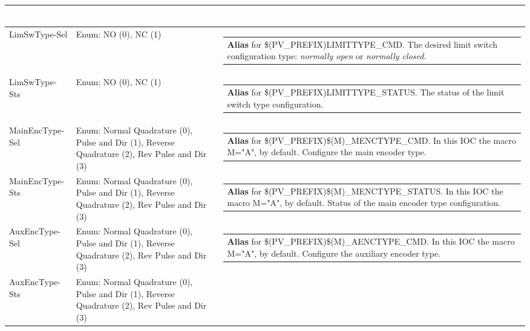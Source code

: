 \documentclass[openany]{article}
\begin{document}
\begin{longtable}{| m{4.5cm} m{2.5cm}  m{8.5cm} |}
\begin{tabular}{@{}m{6cm}@{}}
            \end{tabular} \hypertarget{pv:lim-sw-type}{}\\ \hline
        LimSwType-Sel & Enum: NO (0), NC (1) & \begin{tabular}{@{}m{6cm}@{}}
                \textbf{\color{blue} Alias} for \$(PV\_PREFIX)LIMITTYPE\_CMD. The desired limit switch configuration type: \emph{normally open} or \emph{normally closed}.
            \end{tabular} \hypertarget{}{}\\ \hline
        LimSwType-Sts & Enum: NO (0), NC (1) & \begin{tabular}{@{}m{6cm}@{}}
                \textbf{\color{blue} Alias} for \$(PV\_PREFIX)LIMITTYPE\_STATUS. The status of the limit switch type configuration.
            \end{tabular} \hypertarget{pv:main-enc-type}{}\\ \hline
        MainEncType-Sel & Enum: Normal Quadrature (0), Pulse and Dir (1), Reverse Quadrature (2), Rev Pulse and Dir (3) & \begin{tabular}{@{}m{6cm}@{}}
                \textbf{\color{blue} Alias} for \$(PV\_PREFIX)\$(M)\_MENCTYPE\_CMD. In this IOC the macro M="A", by default. Configure the main encoder type.
            \end{tabular} \hypertarget{}{}\\ \hline
        MainEncType-Sts & Enum: Normal Quadrature (0), Pulse and Dir (1), Reverse Quadrature (2), Rev Pulse and Dir (3) & \begin{tabular}{@{}m{6cm}@{}}
                \textbf{\color{blue} Alias} for \$(PV\_PREFIX)\$(M)\_MENCTYPE\_STATUS. In this IOC the macro M="A", by default. Status of the main encoder type configuration.
            \end{tabular} \hypertarget{pv:aux-enc-type}{}\\ \hline
        AuxEncType-Sel & Enum: Normal Quadrature (0), Pulse and Dir (1), Reverse Quadrature (2), Rev Pulse and Dir (3) & \begin{tabular}{@{}m{6cm}@{}}
                \textbf{\color{blue} Alias} for \$(PV\_PREFIX)\$(M)\_AENCTYPE\_CMD. In this IOC the macro M="A", by default. Configure the auxiliary encoder type.
            \end{tabular} \hypertarget{}{}\\ \hline
        AuxEncType-Sts & Enum: Normal Quadrature (0), Pulse and Dir (1), Reverse Quadrature (2), Rev Pulse and Dir (3) & \begin{tabular}{@{}m{6cm}@{}}

\end{tabular}
\end{longtable}
\end{document}

